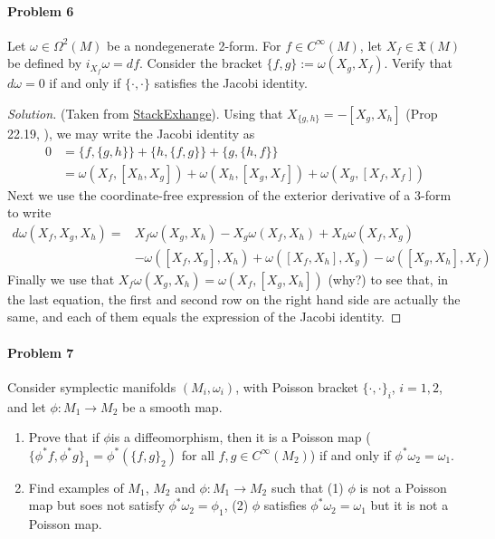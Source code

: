 \paragraph{Problem 6} Let $\omega\in\Omega^2(M)$ be a nondegenerate 2-form. For $f\in C^\infty(M)$, let $X_f\in\mathfrak{X}(M)$ be defined by $i_{X_{f}}\omega=df$. Consider the bracket $\{f,g\}:=\omega(X_g,X_f)$. Verify that $d\omega=0$ if and only if $\{\cdot ,\cdot \}$ satisfies the Jacobi identity.

\begin{proof}[Solution]\leavevmode
	(Taken from \href{https://math.stackexchange.com/questions/1692891/how-to-show-that-jacobi-identity-for-is-equivalent-to-omega-being-clo}{StackExhange}). Using that $X_{\{g,h\}} =-[X_g,X_h]$ (Prop 22.19, \cite{lee} ), we may write the Jacobi identity as
	\begin{align*}
		0&=\{f,\{g,h\}\}+\{h,\{f,g\}\} +\{g,\{h,f\}\} \\
		 &=\omega(X_f,[X_h,X_g])+\omega(X_h,[X_g,X_f])+\omega(X_g,[X_f,X_f])
	\end{align*}
	Next we use the coordinate-free expression of the exterior derivative of a 3-form to write
	\begin{align*}
		d\omega(X_f,X_g,X_h)=&X_f\omega(X_g,X_h)-X_g\omega(X_f,X_h)+X_h\omega(X_f,X_g)\\
				     &-\omega([X_f,X_g],X_h)+\omega([X_f,X_h],X_g)-\omega([X_g,X_h],X_f)
	\end{align*}
	Finally we use that $X_f\omega(X_g,X_h)=\omega(X_f,[X_g,X_h])$ ({\color{magenta}why?)} to see that, in the last equation, the first and second row on the right hand side are actually the same, and each of them equals the expression of the Jacobi identity.
\end{proof}

\paragraph{Problem 7} Consider symplectic manifolds $(M_i,\omega_i)$, with Poisson bracket $\{\cdot ,\cdot \}_{i}$, $i=1,2$, and let  $\phi:M_1\to M_2$ be a smooth map.
\begin{enumerate}[label=\alph*.]
	\item Prove that if $\phi$is a diffeomorphism, then it is a Poisson map ($\{\phi^*f,\phi^*g\}_1=\phi^* (\{f,g\}_2)$ for all $f,g\in C^\infty(M_2)$) if and only if $\phi^*\omega_2=\omega_1$.

	\item Find examples of $M_1$, $M_2$ and $\phi:M_1\to M_2$ such that (1) $\phi$ is not a Poisson map but soes not satisfy $\phi^*\omega_2=\phi_1$, (2) $\phi$ satisfies $\phi^*\omega_2=\omega_1$ but it is not a Poisson map.
\end{enumerate}

